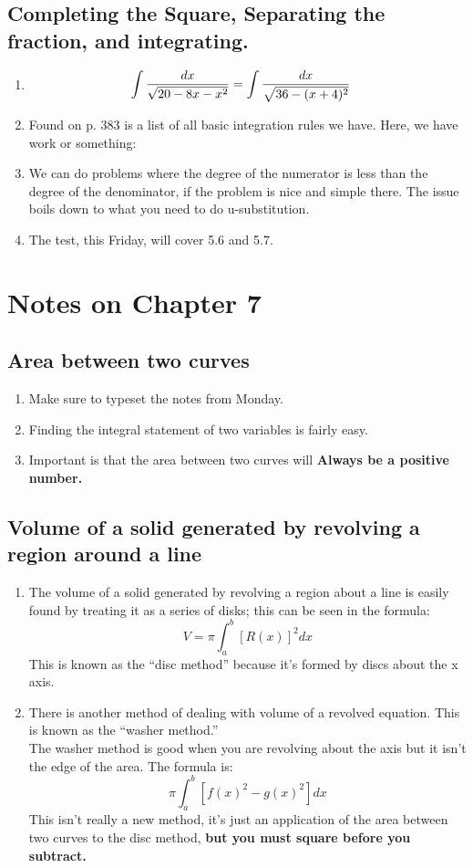 \documentclass[11pt]{article}
\begin{document}
\subsection{Completing the Square, Separating the fraction, and integrating.}
	\begin{enumerate}
		\item
		\begin{align}
			\setcounter{equation}{0}
			\int \frac{dx}{\sqrt{20-8x-x^2}} &= \int \frac{dx}{\sqrt{36-(x+4)^2}}
		\end{align}
	\item Found on p. 383 is a list of all basic integration rules we have.  
		Here,	we have work or something:
	\item We can do problems where the degree of the numerator is less than the
		degree of the denominator, if the problem is nice and simple there.  The
		issue boils down to what you need to do u-substitution.
	\item The test, this Friday, will cover 5.6 and 5.7.
	\end{enumerate}
\section{Notes on Chapter 7}
\subsection{Area between two curves}
\begin{enumerate}
	\item Make sure to typeset the notes from Monday.  
	\item Finding the integral statement of two variables is fairly easy.
	\item Important is that the area between two curves will \bf{Always be a
		positive number}.
\end{enumerate}
\subsection{Volume of a solid generated by revolving a region around a line}
\begin{enumerate}
	\item The volume of a solid generated by revolving a region about a line
		is easily found by treating it as a series of disks; this can be seen
		in the formula:
		\[
			V = \pi\int_{a}^{b}\left[R(x)\right]^2 dx
		\]
		This is known as the ``disc method'' because it's formed by discs
		about the x axis.
	\item There is another method of dealing with volume of a revolved
		equation.  This is known as the ``washer method.'' \\
		The washer method is good when you are revolving about the axis but
		it isn't the edge of the area.  The formula is:
		\[
			\pi \int_{a}^{b}\left[ f(x)^2 - g(x)^2 \right] dx
		\]
		This isn't really a new method, it's just an application of the area
		between two curves to the disc method, \bf{but you must square before you
		subtract}.
\end{enumerate}
\end{document}
